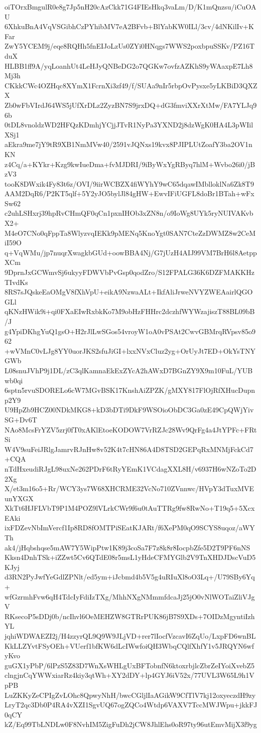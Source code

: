oiTOrxBmgulR0e8g7Jp5nH20cAzCkk71G4FIEsHkq3vaLm/D/K1mQnzsu/iCuOAU
6XhkuBnA4VqVSGibhCzPYhibMV7eA2BFvb+BlYabKW0ILl/3cv/4dNKilIv+KFar
ZwY5YCEM9j/eqe8RQHh5fnEIJoLzUs0ZYi0HNqgs7WWS2poxbpuSSKv/PZ16TduX
HLBB1ff9A/yqLoanhUt4LeHJyQNBeDG2o7QGKw7ovfzAZKhS9yWAaxpE7Lh8Mj3h
CKkkCWc4OZHqc8XYmX1FcrnXi3zf49/f/SUAa9nIr5rbpOvPysxe5yLKBiD3QXZX
Zb0wFbVIrdJ64WS5jUfXrDLz2ZyzBN7S9jrxDQ+dG3fmviXXrXtMw/FA7YLJq96b
0tDL8vnoldzWD2HFQzKDmhjYCjjJTvR1NyPa3YXND2j8dzWgK0HA4L3pWIilXSj1
aEkra9me7jY9tR9XB1NmMVw40/2591vJQNxs19kvx8PJIPLUtZoafY3ba2OV1nKN
z4Cq/a+KYkr+Kzg9kwIueDma+fvMJDRI/9iByWxYgRByq7hlM+Wvbo26i0/jBzV3
tooK8DWxik4Fy83t6z/OVI/9iirWCBZX4fiWYhY9wC65dqawIMblloklNa6Zk8T9
AAM2DqR6/P2KT5qlf+5Y2yJO5bylJl84gHW+EwvIFiUGFL8doBr1BTah+wFxSw62
c2uhLSHxrj39hpRvCHmQF0qCn1pxnIHOb3xZN8n/o9IoWg8UYk5ryNUIVAKvbX2+
M4eO7CNo0qFppTa8WlyzvqIEKk9pMENq5KnoYgt0SAN7CteZzDWMZ8w2CeMiI59O
q+VqWMu/jp7nuqrXwagkbGUd+oowBBA4Nj/G7jUzH4AIJ99VM7BrH6l8AetppXCm
9DprnJxGCWmvSj6ukyyFDWVbPvGsp0qodZro/S12FPALG36K6DZFMAKKHzTIvdKs
8RS7sJQskeEaOMgV8fXhVpU+eikA9NzwaALt+IkfAliJrweNVYZWEAairlQGOGLl
qKNzHWik9i+qi0FXaEIwRxbkKo7M9obHzFHHrc2dczhfWYWzajiszT88BL09bB/J
g4YpiDKhgYuQ1gsO+H2rJlLwSGos54vroyW1oA0vPSAt2CwvGBMrqRVpsv85o962
+wVMnC0vLJg8YY0uorJKS2sfuJiGI+lxxNVxCluz2yg+OrUyJt7ED+OkYsTNYGWb
L08snuJVhP9j1DL/zC3qlKamnaEkExZYcA2hAWxD7BGnZY9X9m10FuL/YUBwb0qi
6sptn5rvuSDORELo6cW7MGvBSK17KnshAiZPZK/gMXY817FlOjRfXHucDupnp2Y9
U9HpZb9HCZ00NDkMKG8+kD3bDTi9DkF9WSOioObDC3Ga0zE49CpQWjYivSG+Dv6T
NAo8McsFrYZV5zrj0fT0xAKlEtoeKODOW7VrRZJc28Wv9QrFg4a4JtYPFc+FRtSi
W4V9suFeiJRlgJamrvRJnHw8v52K4t7cHN86A4D8TSD2GEPqRxMNMjFckCd7+CQA
nTdHxeudiRJgL98uxNe262PDrF6tRyYEmK1VCdagXXL8H/v6937H6wNZoTo2D2Xg
X/et3m16o5+Rr/WCY3ys7W68XHCRME32VcNo710ZVnnwc/HVpY3dTuxMVEunYXGX
XkTt6HJFLVbT9P1M4POZ9lVLrkCWr9f6u0tAuTTRg9fw8RwNo+T19q5+5XcxEAki
ixFDZevNbImVercf1Ip8RD8fOMTPiSEatKJARt/f6XePM0qO9SCYS8uqoz/aWYTh
ak4/jHqbshqse5mAW7Y5WipPtw1K89j3coSa7F7z8k8r8IocpbZfe5D2T9PF6nNS
Kksn4DnhTSk+iZZwt5Cv6QTdE08r5msL1yHdeCFMYGlb2V9TnXHDJDscVuD5KJyj
d3RN2PyJwfYeGdlZPNlt/ed5ym+iJcbmd4b5V5g4uRIuXl8oO3Lq+/U79SBy6Yq+
wfGzrmhFvw6qH4TdcIyFdiIzTXg/MhhNXgNMmmfdcaJj25jO0vNlWOTaiZliVJgV
RKsecoP5sDDj0b/ncIhvl6OeMEHZW8GTRrPUK86jB7S9XDs+7OIDzMgyntiIzhYL
jqhiWDWAEZI2j/H4zzyrQL9Q9W9JLjVD+rer7lIocfVzcavI6ZqUo/LxpFD6wnBL
KkLLZYvtFSyOEh+VUerf1bfKW6dLcIWwfoiQH3WbqCQlfXhfY1v5JRQYN6wfyKvo
guGX1yPbP/6lPzS5Z83D7WnXsWHLgUxBFTobnfN6ktoxrbjlcZbrZeIYoiXvebZ5
clngjnCqYWWxiarRz4kiy3qtWh+XY2dDY+lp4GYJ6iV52x/77UVL3W65L9h1VpPB
LuZKKyZeCPIgZvLOhc8QpwyNhH/bwcCGljlIaAGikW9CfTlV7kj12oxyeczdH9zy
LryT2qc3Db0P4RA4vXZI1SgvUQ67ogZQCo4Wtdp6VAXV7TccMWJWpu+jkkFJ0qCY
kZ/Eq99TbLNDLw0F8NvhIM5ZigFuDh2jCW8JhlEhs0oR97ty96utEmvMijX3f9yg
